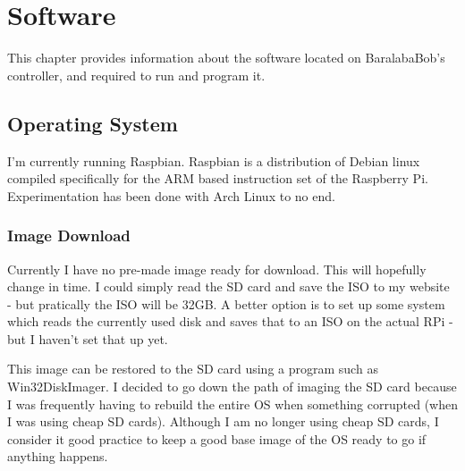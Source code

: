 	\chapter{Software}
		This chapter provides information about the software located on BaralabaBob's controller, and required to run and program it.
		\pagebreak
	
		\section{Operating System}
			I'm currently running Raspbian. Raspbian is a distribution of Debian linux compiled specifically for the ARM based instruction set of the Raspberry Pi. Experimentation has been done with Arch Linux to no end.
		
			\subsection{Image Download}
				Currently I have no pre-made image ready for download. This will hopefully change in time. I could simply read the SD card and save the ISO to my website - but pratically the ISO will be 32GB. A better option is to set up some system which reads the currently used disk and saves that to an ISO on the actual RPi - but I haven't set that up yet.
				
				This image can be restored to the SD card using a program such as Win32DiskImager. I decided to go down the path of imaging the SD card because I was frequently having to rebuild the entire OS when something corrupted (when I was using cheap SD cards). Although I am no longer using cheap SD cards, I consider it good practice to keep a good base image of the OS ready to go if anything happens.
	
	
